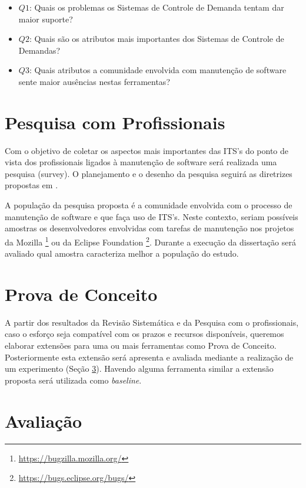 \documentclass[msc,proposal,hidelot,hideabstract]{ppgccufmg} %
\begin{document}
\begin{itemize}
  \item \textbf{$Q1$}: Quais os problemas os Sistemas de Controle de Demanda tentam dar maior suporte?
  \item \textbf{$Q2$}: Quais são os atributos mais importantes dos Sistemas de
    Controle de Demandas?
  \item \textbf{$Q3$}: Quais atributos a comunidade envolvida com manutenção de
    software sente maior ausências nestas ferramentas?
  \end{itemize}

\section{Pesquisa com Profissionais}
\label{sec:survey}
Com o objetivo de coletar os aspectos mais importantes das ITS's do ponto de
vista dos profissionais ligados à manutenção de software será realizada uma
 pesquisa (survey). O planejamento e o desenho da pesquisa seguirá
as diretrizes propostas em \cite{wohlin2012experimentation}.

A população da pesquisa proposta é a comunidade envolvida com o processo de
manutenção de software e que faça uso de ITS's. Neste contexto, seriam
possíveis amostras os desenvolvedores envolvidas com tarefas de manutenção nos
projetos da Mozilla \footnote{\url{https://bugzilla.mozilla.org/}} ou da
Eclipse Foundation \footnote{\url{https://bugs.eclipse.org/bugs/}}. Durante a
execução da dissertação será avaliado qual amostra caracteriza melhor a
população do estudo.

\section{Prova de Conceito}
\label{sec:prova-conceito}

A partir dos resultados da Revisão Sistemática e da Pesquisa com o
profissionais, caso o esforço seja compatível com os prazos e recursos disponíveis, queremos
elaborar extensões para uma ou mais ferramentas como Prova de Conceito. Posteriormente esta extensão
será apresenta e avaliada mediante a realização de um experimento (Seção
\ref{sec:avaliacao}). Havendo alguma ferramenta similar a extensão proposta será utilizada como \textit{baseline}.

\section{Avaliação}
\label{sec:avaliacao}
\end{document}
